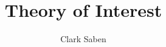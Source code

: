 \documentclass[12pt]{article}
\newenvironment{theorem}[2][Theorem]{\begin{trivlist}
\item[\hskip \labelsep {\bfseries #1}\hskip \labelsep {\bfseries #2.}]}{\end{trivlist}}
\newenvironment{lemma}[2][Lemma]{\begin{trivlist}
\item[\hskip \labelsep {\bfseries #1}\hskip \labelsep {\bfseries #2.}]}{\end{trivlist}}
\newenvironment{exercise}[2][Exercise]{\begin{trivlist}
\item[\hskip \labelsep {\bfseries #1}\hskip \labelsep {\bfseries #2.}]}{\end{trivlist}}
\newenvironment{problem}[2][Problem]{\begin{trivlist}
\item[\hskip \labelsep {\bfseries #1}\hskip \labelsep {\bfseries #2.}]}{\end{trivlist}}
\newenvironment{question}[2][Question]{\begin{trivlist}
\item[\hskip \labelsep {\bfseries #1}\hskip \labelsep {\bfseries #2.}]}{\end{trivlist}}
\newenvironment{corollary}[2][Corollary]{\begin{trivlist}
\item[\hskip \labelsep {\bfseries #1}\hskip \labelsep {\bfseries #2.}]}{\end{trivlist}}
\begin{document}
 
 
\title{Theory of Interest}%
\author{Clark Saben\\ %
}%
\maketitle
\end{document}
